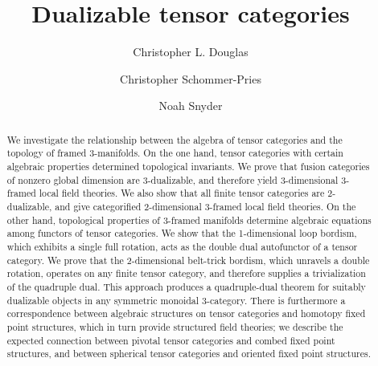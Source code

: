 \documentclass{amsart}
\begin{document}
\title{Dualizable tensor categories}

\begin{abstract}
We investigate the relationship between the algebra of tensor categories and the topology of framed 3-manifolds.  On the one hand, tensor categories with certain algebraic properties determined topological invariants.  We prove that fusion categories of nonzero global dimension are 3-dualizable, and therefore yield 3-dimensional 3-framed local field theories.  We also show that all finite tensor categories are 2-dualizable, and give categorified 2-dimensional 3-framed local field theories.  On the other hand, topological properties of 3-framed manifolds determine algebraic equations among functors of tensor categories.  We show that the 1-dimensional loop bordism, which exhibits a single full rotation, acts as the double dual autofunctor of a tensor category.  We prove that the 2-dimensional belt-trick bordism, which unravels a double rotation, operates on any finite tensor category, and therefore supplies a trivialization of the quadruple dual.  This approach produces a quadruple-dual theorem for suitably dualizable objects in any symmetric monoidal 3-category.  There is furthermore a correspondence between algebraic structures on tensor categories and homotopy fixed point structures, which in turn provide structured field theories; we describe the expected connection between pivotal tensor categories and combed fixed point structures, and between spherical tensor categories and oriented fixed point structures.
\end{abstract}

\author{Christopher L. Douglas}
\address{Mathematical Institute\\ University of Oxford\\ Oxford OX2 6GG\\ United Kingdom}
      	
\author{Christopher Schommer-Pries}
\address{Department of Mathematics\\ Max Planck Institute for Mathematics \\ 53111 Bonn \\ Germany}

\author{Noah Snyder}
\address{Department of Mathematics\\ Indiana University\\ Bloomington, IN 47401\\ USA}
\end{document}
